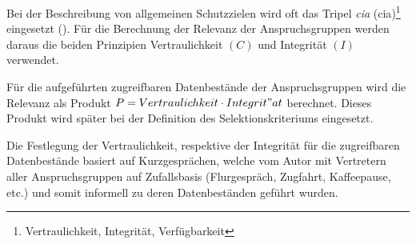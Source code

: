 \documentclass[../../main.tex]{subfiles}
\begin{document}
\begin{sloppypar}
Bei der Beschreibung von allgemeinen Schutzzielen wird oft das Tripel \textit{\acrlong{cia}} (\acrshort{cia})\footnote{Vertraulichkeit, Integrität, Verfügbarkeit} eingesetzt (\cite{harris_cissp_2013}). Für die Berechnung der Relevanz der Anspruchsgruppen werden daraus die beiden Prinzipien Vertraulichkeit $(C)$ und Integrität $(I)$ verwendet.

Für die aufgeführten zugreifbaren Datenbestände der Anspruchsgruppen wird die Relevanz als Produkt $P =  Vertraulichkeit \cdot Integrit"at$ berechnet. Dieses Produkt wird später bei der Definition des Selektionskriteriums eingesetzt. 

Die Festlegung der Vertraulichkeit, respektive der Integrität für die zugreifbaren Datenbestände basiert auf Kurzgesprächen, welche vom Autor mit Vertretern aller Anspruchsgruppen auf Zufallsbasis (Flurgespräch, Zugfahrt, Kaffeepause, etc.) und somit informell  zu deren Datenbeständen geführt wurden. 
\end{sloppypar}

\end{document}
